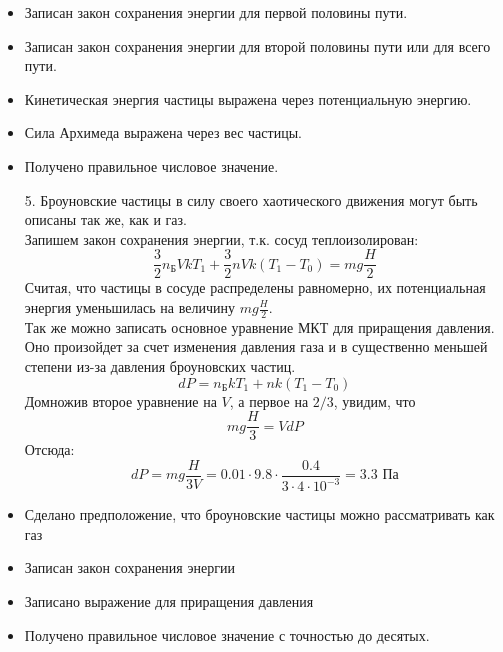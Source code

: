 \documentclass[a4paper, 12pt, oneside]{book}
\begin{document}
\begin{itemize}
\item Записан закон сохранения энергии для первой половины пути.
\item Записан закон сохранения энергии для второй половины пути или для всего пути.
\item Кинетическая энергия частицы выражена через потенциальную энергию.
\item Сила Архимеда выражена через вес частицы.
\item Получено правильное числовое значение.
\end{itemize}
\begin{enumerate}
\item[5.] Броуновские частицы в силу своего хаотического движения могут быть описаны так же, как и газ.\\
Запишем закон сохранения энергии, т.к. сосуд теплоизолирован:
$$\frac{3}{2}n_\text{Б}VkT_1+\frac{3}{2}nVk(T_1-T_0 )=mg\frac{H}{2}$$
Считая, что частицы в сосуде распределены равномерно, их потенциальная энергия уменьшилась на величину $mg\frac{H}{2}$.\\
Так же можно записать основное уравнение МКТ для приращения давления. Оно произойдет за счет изменения давления газа и в существенно меньшей степени из-за давления броуновских частиц.
$$dP=n_\text{Б}kT_1+nk(T_1-T_0)$$
Домножив второе уравнение на $V$, а первое на $2/3$, увидим, что
$$mg\frac{H}{3}=VdP$$
Отсюда: 
$$dP=mg\frac{H}{3V}=0.01\cdot9.8\cdot\frac{0.4}{3\cdot4\cdot10^{-3}}=3.3\text{ Па}$$
\end{enumerate}
\begin{itemize}
\item Сделано предположение, что броуновские частицы можно рассматривать как газ
\item Записан закон сохранения энергии
\item Записано выражение для приращения давления
\item Получено правильное числовое значение с точностью до десятых.
\end{itemize}
\end{document}
